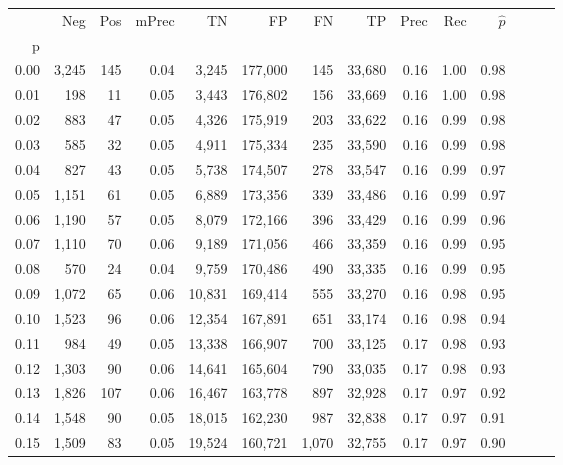 \begin{tabular}{rrrrrrrrrrrrrr}
\toprule
{} &    Neg &  Pos & mPrec &       TN &       FP &      FN &      TP &  Prec &   Rec & $\hat{p}$ \\
p    &        &      &       &          &          &         &         &       &       &           \\
\midrule
0.00 &  3,245 &  145 &  0.04 &    3,245 &  177,000 &     145 &  33,680 &  0.16 &  1.00 &      0.98 \\
0.01 &    198 &   11 &  0.05 &    3,443 &  176,802 &     156 &  33,669 &  0.16 &  1.00 &      0.98 \\
0.02 &    883 &   47 &  0.05 &    4,326 &  175,919 &     203 &  33,622 &  0.16 &  0.99 &      0.98 \\
0.03 &    585 &   32 &  0.05 &    4,911 &  175,334 &     235 &  33,590 &  0.16 &  0.99 &      0.98 \\
0.04 &    827 &   43 &  0.05 &    5,738 &  174,507 &     278 &  33,547 &  0.16 &  0.99 &      0.97 \\
0.05 &  1,151 &   61 &  0.05 &    6,889 &  173,356 &     339 &  33,486 &  0.16 &  0.99 &      0.97 \\
0.06 &  1,190 &   57 &  0.05 &    8,079 &  172,166 &     396 &  33,429 &  0.16 &  0.99 &      0.96 \\
0.07 &  1,110 &   70 &  0.06 &    9,189 &  171,056 &     466 &  33,359 &  0.16 &  0.99 &      0.95 \\
0.08 &    570 &   24 &  0.04 &    9,759 &  170,486 &     490 &  33,335 &  0.16 &  0.99 &      0.95 \\
0.09 &  1,072 &   65 &  0.06 &   10,831 &  169,414 &     555 &  33,270 &  0.16 &  0.98 &      0.95 \\
0.10 &  1,523 &   96 &  0.06 &   12,354 &  167,891 &     651 &  33,174 &  0.16 &  0.98 &      0.94 \\
0.11 &    984 &   49 &  0.05 &   13,338 &  166,907 &     700 &  33,125 &  0.17 &  0.98 &      0.93 \\
0.12 &  1,303 &   90 &  0.06 &   14,641 &  165,604 &     790 &  33,035 &  0.17 &  0.98 &      0.93 \\
0.13 &  1,826 &  107 &  0.06 &   16,467 &  163,778 &     897 &  32,928 &  0.17 &  0.97 &      0.92 \\
0.14 &  1,548 &   90 &  0.05 &   18,015 &  162,230 &     987 &  32,838 &  0.17 &  0.97 &      0.91 \\
0.15 &  1,509 &   83 &  0.05 &   19,524 &  160,721 &   1,070 &  32,755 &  0.17 &  0.97 &      0.90 \\

\end{tabular}
